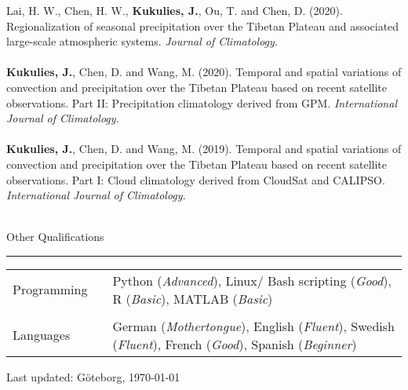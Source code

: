 \documentclass[a4paper,12pt]{article}
\begin{document}
\begin{titlepage}
\begin{table}[h!]
Lai, H. W., Chen, H. W., \textbf{Kukulies, J.}, Ou, T. and  Chen, D. (2020). Regionalization of seasonal precipitation over the Tibetan Plateau and associated large-scale atmospheric systems. \textit{Journal of Climatology.}\\
\\[-1.7ex]


    \textbf{Kukulies, J.}, Chen, D. and Wang, M. (2020). Temporal and spatial variations of convection and precipitation over the Tibetan Plateau based on recent satellite observations. Part II: Precipitation climatology derived from GPM. \textit{International Journal of Climatology.}\\

        \\[-1.7ex]


    \textbf{Kukulies, J.}, Chen, D. and Wang, M. (2019). Temporal and spatial variations of convection and precipitation over the Tibetan Plateau based on recent satellite observations. Part I: Cloud climatology derived from CloudSat and CALIPSO. \textit{International Journal of Climatology.}\\
    \\[-1.7ex]

\end{table}


\flushtop
\flushleft\large Other Qualifications
\\[-2ex]
\rule{1\textwidth}{0.7pt}
\begin{table}[h!]
	\begin{tabular}{p{3.7cm}p{1cm}|p{11cm}}
		Programming & &  Python (\textit{Advanced}), Linux/ Bash scripting (\textit{Good}), R (\textit{Basic}), MATLAB (\textit{Basic})\\
		& & \\	[-2.5ex]
		Languages & & German (\textit{Mothertongue}), English (\textit{Fluent}), Swedish (\textit{Fluent}), French (\textit{Good}), Spanish (\textit{Beginner}) \\
	\end{tabular}
\end{table}






		

\flushright\small Last updated: G\"{o}teborg, \today

\end{titlepage}
\end{document}
